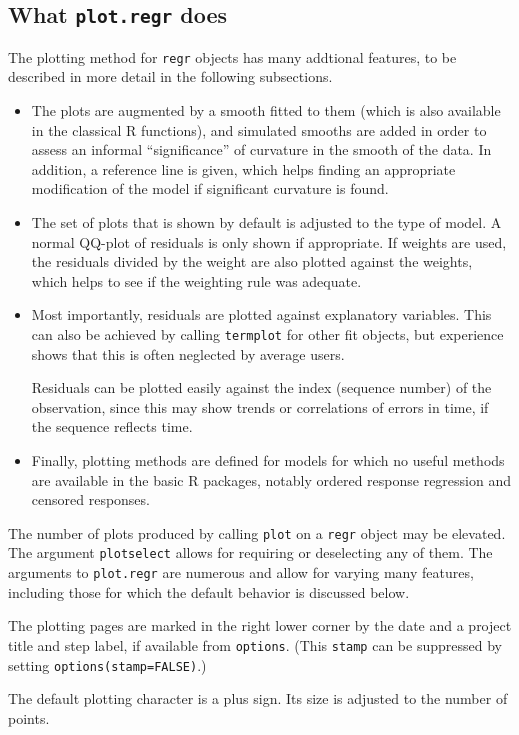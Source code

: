 \documentclass{article}
\providecommand{\T}{\texttt}
\begin{document}
\subsection{What \T{plot.regr} does}
The plotting method for \T{regr} objects has many addtional features, to be
described in more detail in the following subsections.
\begin{itemize}
\item
The plots are augmented by a smooth fitted to them (which is also
available in the classical R functions), and simulated smooths are added in
order to assess an informal ``significance'' of curvature in the smooth of
the data. In addition, a reference line is given, which helps finding
an appropriate modification of the model if significant curvature is
found. 
\item
The set of plots that is shown by default is adjusted to the type of
model. A normal QQ-plot of residuals is only shown if appropriate.
If weights are used, the residuals divided by the weight 
are also plotted against the
weights, which helps to see if the weighting rule was adequate.
\item 
Most importantly, residuals are plotted against explanatory variables.
This can also be achieved by calling \T{termplot} for other fit objects,  
but experience shows that this is often neglected by average users.

Residuals can be plotted easily against the index (sequence
number) of the observation, since this may show trends or 
correlations of errors in time, if the sequence reflects time.
\item
Finally, plotting methods are defined for models for which no useful 
methods are available in the basic R packages, notably ordered response
regression and censored responses.
\end{itemize}

The number of plots produced by calling \T{plot} on a \T{regr} object may
be elevated. The argument \T{plotselect} allows for requiring or deselecting
any of them. 
The arguments to \T{plot.regr} are numerous and allow for varying many
features, including those for which the default behavior is discussed below.

The plotting pages are marked in the right lower corner by the date and a
project title and step label, if available from \T{options}. 
(This \T{stamp} can be suppressed by setting \T{options(stamp=FALSE)}.) 

The default plotting character is a plus sign. Its size is adjusted to
the number of points.
\end{document}
